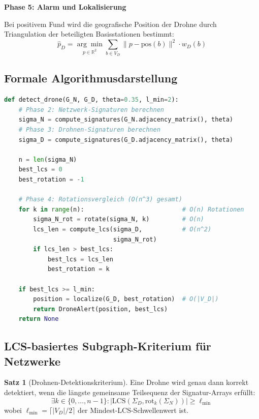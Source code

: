 ﻿\documentclass[a4paper,12pt]{article}
\theoremstyle{definition}
\newtheorem{satz}{Satz}
\begin{document}
\textbf{Phase 5: Alarm und Lokalisierung}

Bei positivem Fund wird die geografische Position der Drohne durch
Triangulation der beteiligten Basisstationen bestimmt:
\[
\hat{p}_D = \underset{p \in \mathbb{R}^2}{\arg\min} \sum_{b \in V_D} \|p - \mathrm{pos}(b)\|^2 \cdot w_D(b)
\]

\subsection{Formale Algorithmusdarstellung}

\begin{lstlisting}[language=Python, caption={Subgraph-basierte Drohnendetektion (Pseudocode)}]
def detect_drone(G_N, G_D, theta=0.35, l_min=2):
    # Phase 2: Netzwerk-Signaturen berechnen
    sigma_N = compute_signatures(G_N.adjacency_matrix(), theta)
    # Phase 3: Drohnen-Signaturen berechnen
    sigma_D = compute_signatures(G_D.adjacency_matrix(), theta)
    
    n = len(sigma_N)
    best_lcs = 0
    best_rotation = -1
    
    # Phase 4: Rotationsvergleich (O(n^3) gesamt)
    for k in range(n):                           # O(n) Rotationen
        sigma_N_rot = rotate(sigma_N, k)         # O(n)
        lcs_len = compute_lcs(sigma_D,           # O(n^2)
                              sigma_N_rot)
        if lcs_len > best_lcs:
            best_lcs = lcs_len
            best_rotation = k
    
    if best_lcs >= l_min:
        position = localize(G_D, best_rotation)  # O(|V_D|)
        return DroneAlert(position, best_lcs)
    return None
\end{lstlisting}

\subsection{LCS-basiertes Subgraph-Kriterium f\"ur Netzwerke}

\begin{satz}[Drohnen-Detektionskriterium]
\label{satz:kriterium}
    Eine Drohne wird genau dann korrekt detektiert, wenn die l\"angste gemeinsame
    Teilsequenz der Signatur-Arrays erf\"ullt:
    \[
    \exists k \in \{0, \ldots, n-1\}: |\mathrm{LCS}(\Sigma_D, \mathrm{rot}_k(\Sigma_N))| \geq \ell_{\min}
    \]
    wobei $\ell_{\min} = \lceil |V_D| / 2 \rceil$ der Mindest-LCS-Schwellenwert ist.
\end{satz}
\end{document}
